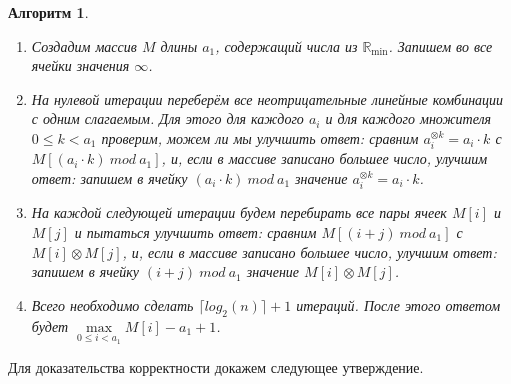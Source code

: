 \documentclass[12pt]{article}
\newtheorem{algorithm}[theorem]{Алгоритм}
\theoremstyle{definition}
\begin{document}
\begin{algorithm} { \ }
\label{algorithm}
\begin{enumerate}
	\item Создадим массив $M$ длины $a_1$, содержащий числа из $\mathbb{R}_{\min}$. Запишем во все ячейки значения $\infty$.
	
	\item На нулевой итерации переберём все неотрицательные линейные комбинации с одним слагаемым. Для этого для каждого $a_i$ и для каждого множителя $0 \le k < a_1$ проверим, можем ли мы улучшить ответ: сравним $a_i^{\otimes k} = a_i \cdot k$ с $M[(a_i \cdot k) \ mod \ a_1]$, и, если в массиве записано большее число, улучшим ответ: запишем в ячейку $(a_i \cdot k) \ mod \ a_1$ значение $a_i^{\otimes k} = a_i \cdot k$.
	
	\item На каждой следующей итерации будем перебирать все пары ячеек $M[i]$ и $M[j]$ и пытаться улучшить ответ: сравним $M[(i + j) \ mod \ a_1]$ с $M[i] \otimes M[j]$, и, если в массиве записано большее число, улучшим ответ: запишем в ячейку $(i + j) \ mod \ a_1$ значение $M[i] \otimes M[j]$.
	
	\item Всего необходимо сделать $\lceil log_2(n) \rceil + 1$ итераций. После этого ответом будет $\max\limits_{0 \le i < a_1} M[i] - a_1 + 1$.
\end{enumerate}
\end{algorithm}

Для доказательства корректности докажем следующее утверждение.
\end{document}
